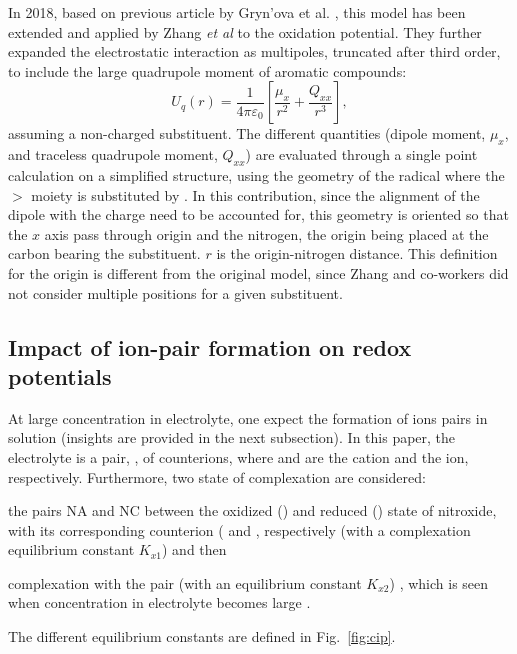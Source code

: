 \documentclass[review]{elsarticle}
\begin{document}
In 2018, based on previous article by Gryn'ova et al. \cite{grynovaOriginScopeLongRange2013,grynovaSwitchingRadicalStability2013}, this model has been extended and applied by Zhang \textit{et al} \cite{zhangEffectHeteroatomFunctionality2018} to the oxidation potential. They further expanded the electrostatic interaction as  multipoles, truncated after third order, to include the large quadrupole moment of aromatic compounds:\begin{equation}
	U_q(r) =\frac{1}{4\pi\varepsilon_0} \left[\frac{\mu_x}{r^2} + \frac{Q_{xx}}{r^3}\right], \label{eq:Er}
\end{equation}
assuming a non-charged substituent. The different quantities (dipole moment, $\mu_x$, and traceless quadrupole moment, $Q_{xx}$) are evaluated through a single point calculation on a simplified structure, using the geometry of the radical where the $>$ moiety is substituted by .  In this contribution, since the alignment of the dipole with the charge need to be accounted for, this geometry is oriented so that the $x$ axis pass through origin and the nitrogen, the origin being placed at the carbon bearing the substituent. $r$ is the origin-nitrogen distance. This definition for the origin is different from the original model, since  Zhang and co-workers did not consider multiple positions for a given substituent. 


\subsection{Impact of ion-pair formation on redox potentials}

At large concentration in electrolyte, one expect the formation of ions pairs in solution (insights are provided in the next subsection).  In this paper, the electrolyte is a pair, , of counterions, where  and  are the cation and the ion, respectively. Furthermore, two state of complexation  are considered: \begin{inparaenum}[(i)]
	\item the pairs NA and NC between the oxidized () and reduced () state of nitroxide, with its corresponding counterion ( and  ,  respectively (with a complexation equilibrium constant $K_{x1}$) and then
	\item complexation with the  pair (with an equilibrium constant $K_{x2}$) , which is seen when concentration in electrolyte becomes large  \cite{wylieImprovedPerformanceAllOrganic2019a}.
\end{inparaenum}
The different equilibrium constants are defined in Fig.~\ref{fig:cip}.
\end{document}

